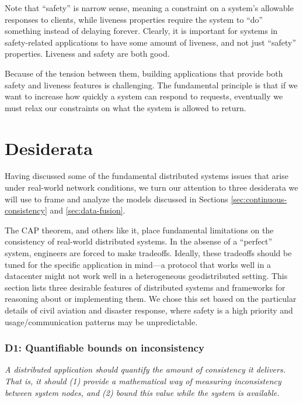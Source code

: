 \documentclass[]             %
{NASA}                       %
\theoremstyle{definition}
\begin{document}
Note that ``safety'' is narrow sense, meaning a constraint on a system's
allowable responses to clients, while liveness properties require the
system to ``do'' something instead of delaying forever. Clearly, it is
important for systems in safety-related applications to have some amount
of liveness, and not just ``safety'' properties. Liveness and safety are
both good.

Because of the tension between them, building applications that provide
both safety and liveness features is challenging. The fundamental
principle is that if we want to increase how quickly a system can
respond to requests, eventually we must relax our constraints on what
the system is allowed to return.

\newpage

\hypertarget{desiderata}{%
\section{Desiderata}\label{desiderata}}

\label{sec:desiderata}

Having discussed some of the fundamental distributed systems issues that
arise under real-world network conditions, we turn our attention to
three desiderata we will use to frame and analyze the models discussed
in Sections \ref{sec:continuous-consistency} and \ref{sec:data-fusion}.

The CAP theorem, and others like it, place fundamental limitations on
the consistency of real-world distributed systems. In the absense of a
``perfect'' system, engineers are forced to make tradeoffs. Ideally,
these tradeoffs should be tuned for the specific application in mind---a
protocol that works well in a datacenter might not work well in a
heterogeneous geodistributed setting. This section lists three desirable
features of distributed systems and frameworks for reasoning about or
implementing them. We chose this set based on the particular details of
civil aviation and disaster response, where safety is a high priority
and usage/communication patterns may be unpredictable.

\hypertarget{d1-quantifiable-bounds-on-inconsistency}{%
\subsubsection{D1: Quantifiable bounds on
inconsistency}\label{d1-quantifiable-bounds-on-inconsistency}}

\emph{A distributed application should quantify the amount of
consistency it delivers. That is, it should (1) provide a mathematical
way of measuring inconsistency between system nodes, and (2) bound
this value while the system is available.}
\end{document}
